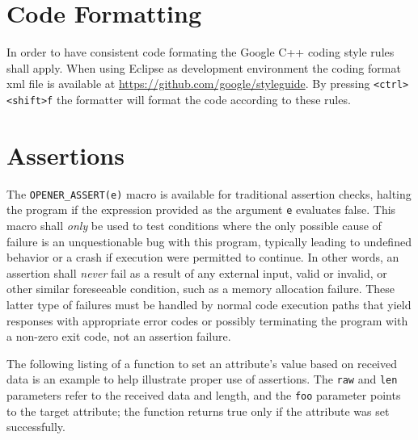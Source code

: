 \documentclass[final,a4paper,10pt, oneside]{article}
\begin{document}
\section{Code Formatting}
In order to have consistent code formating the Google C++ coding style rules shall apply. When using Eclipse as development environment the coding format xml file is available at \url{https://github.com/google/styleguide}. By pressing \verb|<ctrl><shift>f| the formatter will format the code according to these rules.


\section{Assertions}
The \lstinline!OPENER_ASSERT(e)! macro is available for traditional
assertion checks, halting the program if the expression provided as the
argument \lstinline!e! evaluates false. This macro shall \emph{only} be used
to test conditions where the only possible cause of failure is an
unquestionable bug with this program, typically leading to undefined behavior
or a crash if execution were permitted to continue.
In other words, an assertion shall \emph{never} fail
as a result of any external input, valid or invalid,
or other similar foreseeable condition, such as a memory allocation failure.
These latter type of failures must be handled by normal code execution paths
that yield responses with appropriate error codes or possibly
terminating the program with a non-zero exit code, not an assertion failure.

The following listing of a function to set an attribute's value based
on received data is an example to help illustrate proper use of assertions.
The \lstinline!raw! and \lstinline!len! parameters
refer to the received data and length, and the \lstinline!foo! parameter
points to the target attribute; the function returns true only if the attribute
was set successfully.
\end{document}
